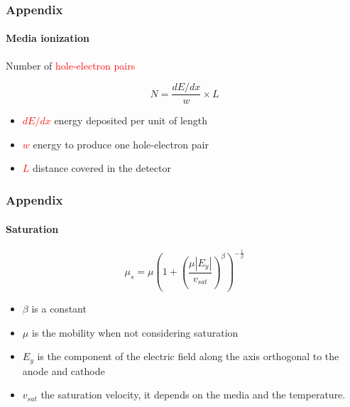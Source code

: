 \documentclass[14pt]{beamer}
\begin{document}
\begin{frame}
\begin{columns}
\begin{column}{0.47\textwidth}
      \end{column}
    \end{columns}

\end{frame}


\begin{frame}
  \frametitle{Appendix}
  \framesubtitle{Media ionization}

  Number of \textcolor{red}{hole-electron pairs}

  \[N = \frac{dE/dx}{w} \times L\]

\begin{itemize}
  \item \textcolor{red}{$dE/dx$} energy deposited per unit of length
  \item \textcolor{red}{$w$} energy to produce one hole-electron pair
  \item \textcolor{red}{$L$} distance covered in the detector
\end{itemize}

\end{frame}

\begin{frame}
  \frametitle{Appendix}
  \framesubtitle{Saturation}

  \begin{equation}
		\mu_s = \mu \left (1 + \left (\frac{\mu |E_y|}{v_{sat}} \right )^{\beta} \right )^{-\frac{1}{\beta}}
		\label{eq:saturation}
	\end{equation}

\begin{itemize}
  \item $\beta$ is a constant
  \item $\mu$ is the mobility when not considering saturation
  \item $E_y$ is the component of the electric field along the axis orthogonal
  to the anode and cathode
  \item $v_{sat}$ the saturation velocity, it depends on the media and the
  temperature.
\end{itemize}

\end{frame}
\end{document}
